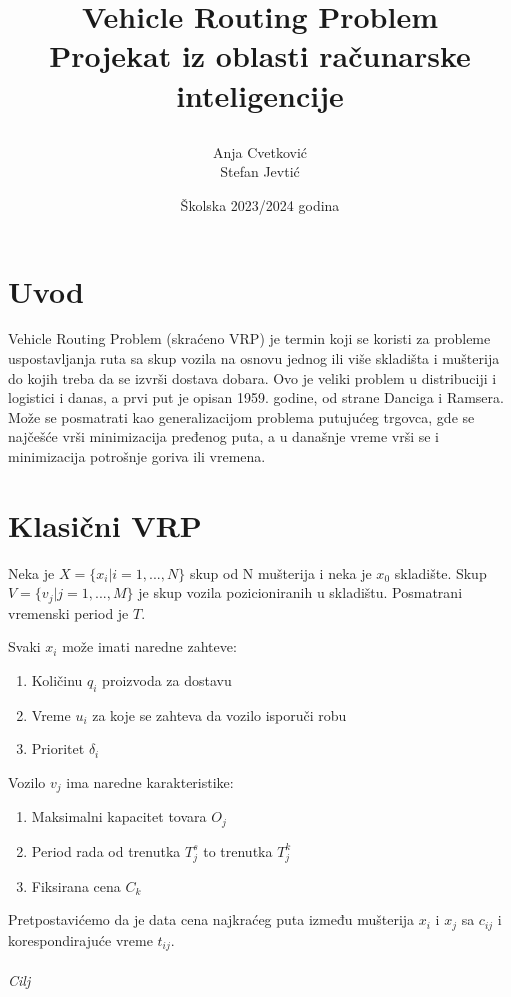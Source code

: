 \documentclass{article}
\title{Vehicle Routing Problem \\
\large
Projekat iz oblasti računarske inteligencije

}
\author{Anja Cvetković\\ Stefan Jevtić}
\date{Školska 2023/2024 godina}
\begin{document}
\maketitle

\section{Uvod}
Vehicle Routing Problem (skraćeno VRP) je termin koji se koristi za probleme uspostavljanja ruta sa skup vozila na osnovu jednog ili više skladišta i mušterija do kojih treba da se izvrši dostava dobara. Ovo je veliki problem u distribuciji i logistici i danas, a prvi put je opisan 1959. godine, od strane Danciga i Ramsera. Može se posmatrati kao generalizacijom problema putujućeg trgovca, gde se najčešće vrši minimizacija pređenog puta, a u današnje vreme vrši se i minimizacija potrošnje goriva ili vremena.

\section{Klasični VRP}
\par
Neka je \(X=\{x_i|i=1,...,N\}\) skup od N mušterija i neka je \(x_0\) skladište. Skup \(V=\{v_j|j=1,...,M\}\) je skup vozila pozicioniranih u skladištu. Posmatrani vremenski period je \(T\). \\
\par
Svaki \(x_i\) može imati naredne zahteve:
\begin{enumerate}
    \item Količinu \(q_i\) proizvoda za dostavu
    \item  Vreme \(u_i\) za koje se zahteva da vozilo isporuči robu
    \item Prioritet \(\delta_i\)
\end{enumerate}
\par
Vozilo \(v_j\) ima naredne karakteristike:
\begin{enumerate}
    \item Maksimalni kapacitet tovara \(O_j\)
    \item Period rada od trenutka \(T^s_j\) to trenutka \(T^k_j\) 
    \item Fiksirana cena \(C_k\)
\end{enumerate}
\par
Pretpostavićemo da je data cena najkraćeg puta između mušterija \(x_i\) i \(x_j\) sa \(c_{ij}\) i korespondirajuće vreme \(t_{ij}\).\\ \\
\large\textit{Cilj}
\end{document}
